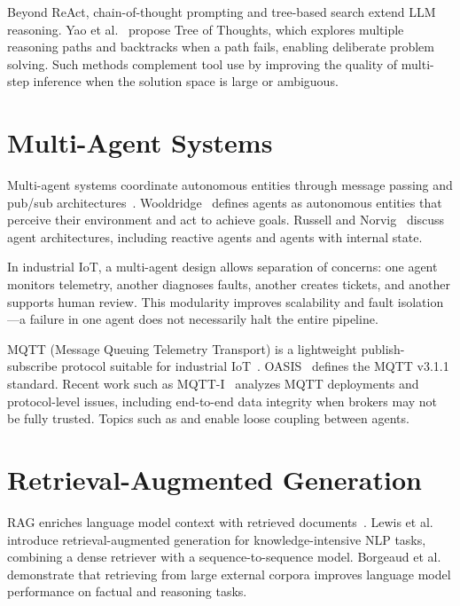 \documentclass[12pt,letterpaper]{report}
\let\oldtexttt\texttt
\renewcommand{\texttt}[1]{\oldtexttt{\seqsplit{#1}}}
\begin{document}
Beyond ReAct, chain-of-thought prompting and tree-based search extend LLM reasoning. Yao et al.~\cite{yao2023tot} propose Tree of Thoughts, which explores multiple reasoning paths and backtracks when a path fails, enabling deliberate problem solving. Such methods complement tool use by improving the quality of multi-step inference when the solution space is large or ambiguous.

\section{Multi-Agent Systems}

Multi-agent systems coordinate autonomous entities through message passing and pub/sub architectures~\cite{wooldridge2009multiagent,russell2020aima}. Wooldridge~\cite{wooldridge2009multiagent} defines agents as autonomous entities that perceive their environment and act to achieve goals. Russell and Norvig~\cite{russell2020aima} discuss agent architectures, including reactive agents and agents with internal state.

In industrial IoT, a multi-agent design allows separation of concerns: one agent monitors telemetry, another diagnoses faults, another creates tickets, and another supports human review. This modularity improves scalability and fault isolation---a failure in one agent does not necessarily halt the entire pipeline.

MQTT (Message Queuing Telemetry Transport) is a lightweight publish-subscribe protocol suitable for industrial IoT~\cite{oasis2019mqtt,hussain2021mqtt}. OASIS~\cite{oasis2019mqtt} defines the MQTT v3.1.1 standard. Recent work such as MQTT-I~\cite{hussain2021mqtt} analyzes MQTT deployments and protocol-level issues, including end-to-end data integrity when brokers may not be fully trusted. Topics such as \texttt{telemetry/\{asset\_id\}} and \texttt{alerts/\{asset\_id\}} enable loose coupling between agents.

\section{Retrieval-Augmented Generation}

RAG enriches language model context with retrieved documents~\cite{lewis2020rag,borgeaud2022retrieving}. Lewis et al.~\cite{lewis2020rag} introduce retrieval-augmented generation for knowledge-intensive NLP tasks, combining a dense retriever with a sequence-to-sequence model. Borgeaud et al.~\cite{borgeaud2022retrieving} demonstrate that retrieving from large external corpora improves language model performance on factual and reasoning tasks.
\end{document}
